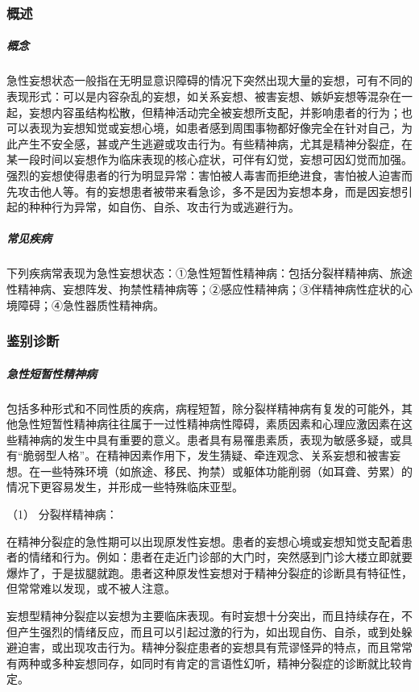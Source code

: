 \subsubsection{概述}

\subparagraph{概念}

急性妄想状态一般指在无明显意识障碍的情况下突然出现大量的妄想，可有不同的表现形式：可以是内容杂乱的妄想，如关系妄想、被害妄想、嫉妒妄想等混杂在一起，妄想内容虽结构松散，但精神活动完全被妄想所支配，并影响患者的行为；也可以表现为妄想知觉或妄想心境，如患者感到周围事物都好像完全在针对自己，为此产生不安全感，甚或产生逃避或攻击行为。有些精神病，尤其是精神分裂症，在某一段时间以妄想作为临床表现的核心症状，可伴有幻觉，妄想可因幻觉而加强。强烈的妄想使得患者的行为明显异常：害怕被人毒害而拒绝进食，害怕被人迫害而先攻击他人等。有的妄想患者被带来看急诊，多不是因为妄想本身，而是因妄想引起的种种行为异常，如自伤、自杀、攻击行为或逃避行为。

\subparagraph{常见疾病}

下列疾病常表现为急性妄想状态：①急性短暂性精神病：包括分裂样精神病、旅途性精神病、妄想阵发、拘禁性精神病等；②感应性精神病；③伴精神病性症状的心境障碍；④急性器质性精神病。

\subsubsection{鉴别诊断}

\subparagraph{急性短暂性精神病}

包括多种形式和不同性质的疾病，病程短暂，除分裂样精神病有复发的可能外，其他急性短暂性精神病往往属于一过性精神病性障碍，素质因素和心理应激因素在这些精神病的发生中具有重要的意义。患者具有易罹患素质，表现为敏感多疑，或具有“脆弱型人格”。在精神因素作用下，发生猜疑、牵连观念、关系妄想和被害妄想。在一些特殊环境（如旅途、移民、拘禁）或躯体功能削弱（如耳聋、劳累）的情况下更容易发生，并形成一些特殊临床亚型。

\hypertarget{text00049.htmlux5cux23CHP1-18-7-2-1-1}{}
（1） 分裂样精神病：

在精神分裂症的急性期可以出现原发性妄想。患者的妄想心境或妄想知觉支配着患者的情绪和行为。例如：患者在走近门诊部的大门时，突然感到门诊大楼立即就要爆炸了，于是拔腿就跑。患者这种原发性妄想对于精神分裂症的诊断具有特征性，但常常难以发现，或不被人注意。

妄想型精神分裂症以妄想为主要临床表现。有时妄想十分突出，而且持续存在，不但产生强烈的情绪反应，而且可以引起过激的行为，如出现自伤、自杀，或到处躲避迫害，或出现攻击行为。精神分裂症患者的妄想具有荒谬怪异的特点，而且常常有两种或多种妄想同存，如同时有肯定的言语性幻听，精神分裂症的诊断就比较肯定。

